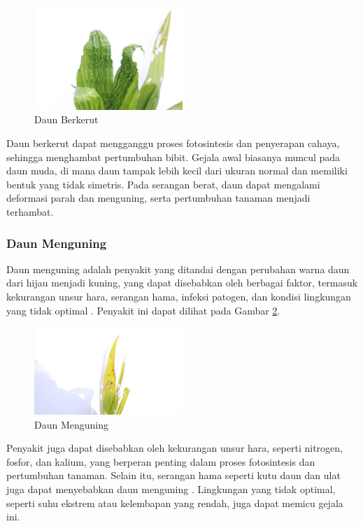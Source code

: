 \begin{figure}[H]
	\centering
	\includegraphics[width=0.5\textwidth]{figure/chapter-2-daun-berkerut.jpg}
	\caption{Daun Berkerut}
	\label{fig:2.Daun Berkerut}
\end{figure}

Daun berkerut dapat mengganggu proses fotosintesis dan penyerapan cahaya, sehingga menghambat pertumbuhan bibit. Gejala awal biasanya muncul pada daun muda, di mana daun tampak lebih kecil dari ukuran normal dan memiliki bentuk yang tidak simetris. Pada serangan berat, daun dapat mengalami deformasi parah dan menguning, serta pertumbuhan tanaman menjadi terhambat.  

\subsubsection{Daun Menguning} \label{II.Daun Menguning}
Daun menguning adalah penyakit yang ditandai dengan perubahan warna daun dari hijau menjadi kuning, yang dapat disebabkan oleh berbagai faktor, termasuk kekurangan unsur hara, serangan hama, infeksi patogen, dan kondisi lingkungan yang tidak optimal \cite{afriliya2019keanekaragaman}\cite{suhesti2022analisis}. Penyakit ini dapat dilihat pada Gambar \ref{fig:2.Daun Menguning}.

\begin{figure}[H]
	\centering
	\includegraphics[width=0.5\textwidth]{figure/chapter-2-daun-menguning.jpg}
	\caption{Daun Menguning}
	\label{fig:2.Daun Menguning}
\end{figure}

Penyakit juga dapat disebabkan oleh kekurangan unsur hara, seperti nitrogen, fosfor, dan kalium, yang berperan penting dalam proses fotosintesis dan pertumbuhan tanaman. Selain itu, serangan hama seperti kutu daun dan ulat juga dapat menyebabkan daun menguning \cite{suhesti2022analisis}. Lingkungan yang tidak optimal, seperti suhu ekstrem atau kelembapan yang rendah, juga dapat memicu gejala ini. 

